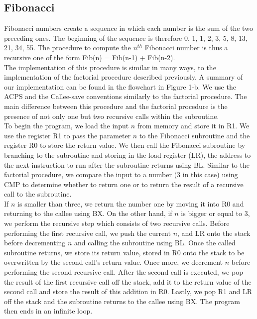 \documentclass[10pt]{article}
\begin{document}
\subsection{Fibonacci}
Fibonacci numbers create a sequence in which each number is the sum of the two preceding ones. The beginning of the sequence is therefore 0, 1, 1, 2, 3, 5, 8, 13, 21, 34, 55. The procedure to compute the $n^{th}$ Fibonacci number is thus a recursive one of the form Fib(n) = Fib(n-1) + Fib(n-2).\\

The implementation of this procedure is similar in many ways, to the implementation of the factorial procedure described previously. A summary of our implementation can be found in the flowchart in Figure 1-b. We use the ACPS and the Callee-save conventions similarly to the factorial procedure. The main difference between this procedure and the factorial procedure is the presence of not only one but two recursive calls within the subroutine.\\
To begin the program, we load the input $n$ from memory and store it in R1. We use the register R1 to pass the parameter $n$ to the Fibonacci subroutine and the register R0 to store the return value. We then call the Fibonacci subroutine by branching to the subroutine and storing in the load register (LR), the address to the next instruction to run after the subroutine returns using BL.
Similar to the factorial procedure, we compare the input to a number (3 in this case) using CMP to determine whether to return one or to return the result of a recursive call to the subroutine.\\
If $n$ is smaller than three, we return the number one by moving it into R0 and returning to the callee using BX. On the other hand, if $n$ is bigger or equal to 3, we perform the recursive step which consists of two recursive calls. Before performing the first recursive call, we push the current $n$, and LR onto the stack before decrementing $n$ and calling the subroutine using BL. Once the called subroutine returns, we store its return value, stored in R0 onto the stack to be overwritten by the second call's return value.  Once more, we decrement $n$ before performing the second recursive call. After the second call is executed, we pop the result of the first recursive call off the stack, add it to the return value of the second call and store the result of this addition in R0. Lastly, we pop R1 and LR off the stack and the subroutine returns to the callee using BX. The program then ends in an infinite loop.\\
\end{document}
